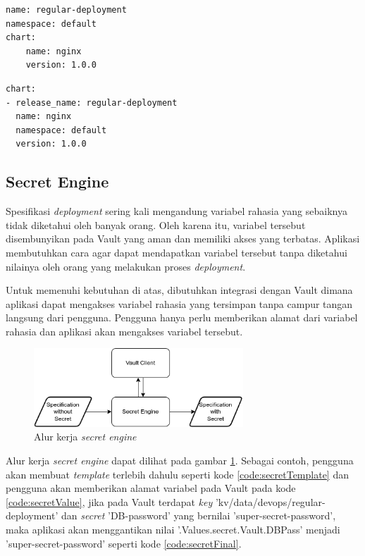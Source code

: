 \begin{lstlisting}[frame=single,caption={Contoh nilai yang dipakai},label={code:templateValue}]
name: regular-deployment
namespace: default
chart:
    name: nginx
    version: 1.0.0
\end{lstlisting}

\begin{lstlisting}[frame=single,caption={Hasil akhir \textit{template}},label={code:finalTemplate}]
chart:
- release_name: regular-deployment
  name: nginx
  namespace: default
  version: 1.0.0
\end{lstlisting}

\subsection{Secret Engine}
\label{sec:vaultEngine}

Spesifikasi \textit{deployment} sering kali mengandung variabel rahasia yang sebaiknya tidak diketahui oleh banyak orang. Oleh karena itu, variabel tersebut disembunyikan pada Vault yang aman dan memiliki akses yang terbatas. Aplikasi membutuhkan cara agar dapat mendapatkan variabel tersebut tanpa diketahui nilainya oleh orang yang melakukan proses \textit{deployment}.

Untuk memenuhi kebutuhan di atas, dibutuhkan integrasi dengan Vault dimana aplikasi dapat mengakses variabel rahasia yang tersimpan tanpa campur tangan langsung dari pengguna. Pengguna hanya perlu memberikan alamat dari variabel rahasia dan aplikasi akan mengakses variabel tersebut. 

\begin{figure}
	\centering
	\includegraphics[width=0.7\textwidth]{pics/SecretEngine.png}
	\caption{Alur kerja \textit{secret engine}}
	\label{fig:alurSecretEngine}
\end{figure}

Alur kerja\textit{ secret engine} dapat dilihat pada gambar \ref{fig:alurSecretEngine}. Sebagai contoh, pengguna akan membuat \textit{template} terlebih dahulu seperti kode \ref{code:secretTemplate} dan pengguna akan memberikan alamat variabel pada Vault pada kode \ref{code:secretValue}, jika pada Vault terdapat \textit{key} 'kv/data/devops/regular-deployment' dan \textit{secret} 'DB-password' yang bernilai 'super-secret-password', maka aplikasi akan menggantikan nilai '.Values.secret.Vault.DBPass' menjadi 'super-secret-password' seperti kode \ref{code:secretFinal}.


